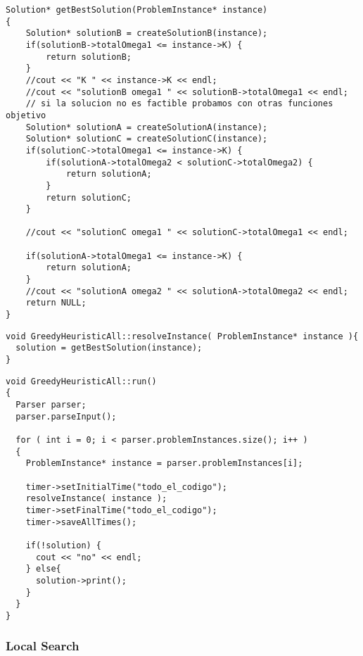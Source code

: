 \begin{lstlisting}[caption=getBestSolution()]
Solution* getBestSolution(ProblemInstance* instance) 
{
    Solution* solutionB = createSolutionB(instance);    
    if(solutionB->totalOmega1 <= instance->K) {
        return solutionB;
    }
    //cout << "K " << instance->K << endl;
    //cout << "solutionB omega1 " << solutionB->totalOmega1 << endl;
    // si la solucion no es factible probamos con otras funciones objetivo    
    Solution* solutionA = createSolutionA(instance);
    Solution* solutionC = createSolutionC(instance);
    if(solutionC->totalOmega1 <= instance->K) {
        if(solutionA->totalOmega2 < solutionC->totalOmega2) {            
            return solutionA;
        }         
        return solutionC;
    }    

    //cout << "solutionC omega1 " << solutionC->totalOmega1 << endl;

    if(solutionA->totalOmega1 <= instance->K) {
        return solutionA;
    }
    //cout << "solutionA omega2 " << solutionA->totalOmega2 << endl;
    return NULL;   
}
\end{lstlisting}
\begin{lstlisting}[caption=GreedyHeuristicAll::resolveInstance()]
void GreedyHeuristicAll::resolveInstance( ProblemInstance* instance ){
  solution = getBestSolution(instance);
}
\end{lstlisting}
\begin{lstlisting}[caption=GreedyHeuristicAll::run()]
void GreedyHeuristicAll::run()
{
  Parser parser;
  parser.parseInput();

  for ( int i = 0; i < parser.problemInstances.size(); i++ )
  {
    ProblemInstance* instance = parser.problemInstances[i];
    
    timer->setInitialTime("todo_el_codigo");
    resolveInstance( instance );       
    timer->setFinalTime("todo_el_codigo");
    timer->saveAllTimes();
    
    if(!solution) {
      cout << "no" << endl;
    } else{
      solution->print();
    }    
  }
}
\end{lstlisting}

\subsubsection{Local Search}

